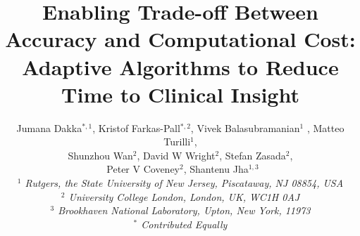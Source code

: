 \documentclass[conference]{IEEEtran}
\begin{document}


\title{Enabling Trade-off Between Accuracy and Computational Cost: Adaptive Algorithms to Reduce Time to Clinical Insight}




\author{Jumana Dakka$^{*,1}$, Kristof Farkas-Pall$^{*,2}$, Vivek Balasubramanian$^{1}$ , Matteo Turilli$^{1}$, \\
 Shunzhou Wan$^{2}$, David W Wright$^{2}$, Stefan Zasada$^{2}$, \\\
 Peter V Coveney$^{2}$, Shantenu Jha$^{1,3}$ \\

  \small{\emph{$^{1}$ Rutgers, the State University of New Jersey, Piscataway, NJ 08854, USA}}\\
   \small{\emph{$^{2}$ University College London, London, UK, WC1H 0AJ}}\\
   \small{\emph{$^{3}$ Brookhaven National Laboratory, Upton, New York, 11973}}\\
   \small{\emph{$^{*}$ Contributed Equally}}
}


\date{}
\maketitle
\end{document}
